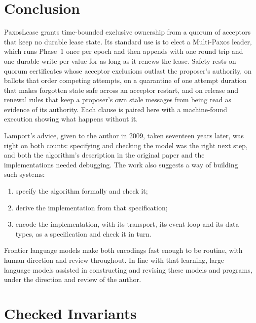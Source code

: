 \documentclass[final,5p,times,twocolumn,number]{elsarticle}
\begin{document}
\section{Conclusion}\label{sec:conclusion}

PaxosLease grants time-bounded exclusive ownership from a quorum of acceptors that keep no durable lease state.  Its standard use is to elect a Multi-Paxos leader, which runs Phase~1 once per epoch and then appends with one round trip and one durable write per value for as long as it renews the lease.  Safety rests on quorum certificates whose acceptor exclusions outlast the proposer's authority, on ballots that order competing attempts, on a quarantine of one attempt duration that makes forgotten state safe across an acceptor restart, and on release and renewal rules that keep a proposer's own stale messages from being read as evidence of its authority.  Each clause is paired here with a machine-found execution showing what happens without it.

Lamport's advice, given to the author in 2009, taken seventeen years later, was right on both counts: specifying and checking the model was the right next step, and both the algorithm's description in the original paper and the implementations needed debugging.  The work also suggests a way of building such systems:

\begin{enumerate}\itemsep0.25em
\item specify the algorithm formally and check it;
\item derive the implementation from that specification;
\item encode the implementation, with its transport, its event loop and its data types, as a specification and check it in turn.
\end{enumerate}

Frontier language models make both encodings fast enough to be routine, with human direction and review throughout.  In line with that learning, large language models assisted in constructing and revising these models and programs, under the direction and review of the author.

\flushcolsend
\clearpage
\appendix
\gdef\thetable{\arabic{table}}
\footnotesize

\section{Checked Invariants}\label{app:invariants}
\end{document}
